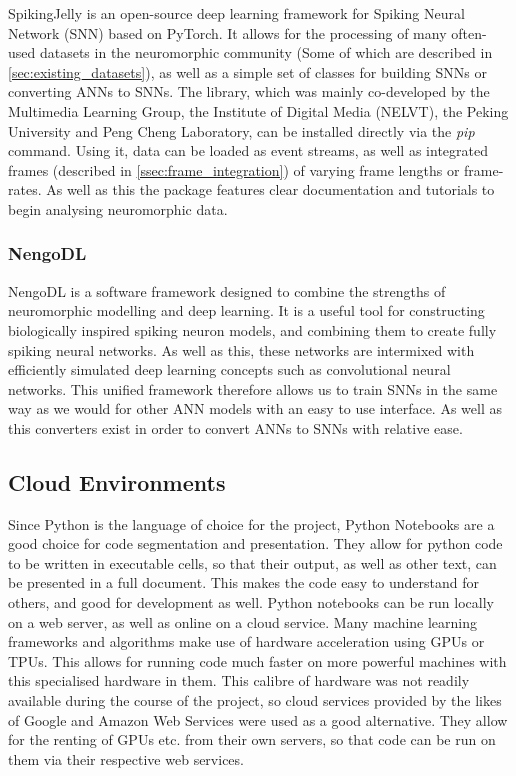SpikingJelly\cite{SpikingJelly} is an open-source deep learning framework for Spiking Neural Network (SNN) based on PyTorch. It allows for the processing of many often-used datasets in the neuromorphic community (Some of which are described in \cref{sec:existing_datasets}), as well as a simple set of classes for building SNNs or converting ANNs to SNNs. The library, which was mainly co-developed by the Multimedia Learning Group, the Institute of Digital Media (NELVT), the Peking University and Peng Cheng Laboratory, can be installed directly via the \emph{pip} command. Using it, data can be loaded as event streams, as well as integrated frames (described in \cref{ssec:frame_integration}) of varying frame lengths or frame-rates. As well as this the package features clear documentation and tutorials to begin analysing neuromorphic data.

\subsubsection{NengoDL} \label{sssec:nengo}

NengoDL\cite{NengoDL} is a software framework designed to combine the strengths of neuromorphic modelling and deep learning. It is a useful tool for constructing biologically inspired spiking neuron models, and combining them to create fully spiking neural networks. As well as this, these networks are intermixed with efficiently simulated deep learning concepts such as convolutional neural networks. This unified framework therefore allows us to train SNNs in the same way as we would for other ANN models with an easy to use interface. As well as this converters exist in order to convert ANNs to SNNs with relative ease.

\subsection{Cloud Environments}

Since Python is the language of choice for the project, Python Notebooks are a good choice for code segmentation and presentation. They allow for python code to be written in executable cells, so that their output, as well as other text, can be presented in a full document. This makes the code easy to understand for others, and good for development as well. Python notebooks can be run locally on a web server, as well as online on a cloud service. Many machine learning frameworks and algorithms make use of hardware acceleration using GPUs or TPUs. This allows for running code much faster on more powerful machines with this specialised hardware in them. This calibre of hardware was not readily available during the course of the project, so cloud services provided by the likes of Google and Amazon Web Services were used as a good alternative. They allow for the renting of GPUs etc. from their own servers, so that code can be run on them via their respective web services. 

